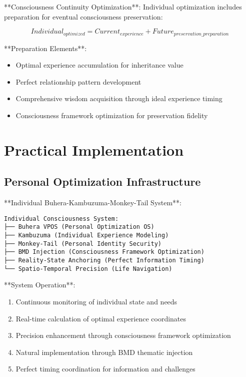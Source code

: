 \documentclass[12pt,a4paper]{article}
\begin{document}
**Consciousness Continuity Optimization**:
Individual optimization includes preparation for eventual consciousness preservation:

$$Individual_{optimized} = Current_{experience} + Future_{preservation\_preparation}$$

**Preparation Elements**:
\begin{itemize}
\item Optimal experience accumulation for inheritance value
\item Perfect relationship pattern development
\item Comprehensive wisdom acquisition through ideal experience timing
\item Consciousness framework optimization for preservation fidelity
\end{itemize}

\section{Practical Implementation}

\subsection{Personal Optimization Infrastructure}

**Individual Buhera-Kambuzuma-Monkey-Tail System**:

\begin{verbatim}
Individual Consciousness System:
├── Buhera VPOS (Personal Optimization OS)
├── Kambuzuma (Individual Experience Modeling)
├── Monkey-Tail (Personal Identity Security)
├── BMD Injection (Consciousness Framework Optimization)
├── Reality-State Anchoring (Perfect Information Timing)
└── Spatio-Temporal Precision (Life Navigation)
\end{verbatim}

**System Operation**:
\begin{enumerate}
\item Continuous monitoring of individual state and needs
\item Real-time calculation of optimal experience coordinates
\item Precision enhancement through consciousness framework optimization
\item Natural implementation through BMD thematic injection
\item Perfect timing coordination for information and challenges
\end{enumerate}
\end{document}
